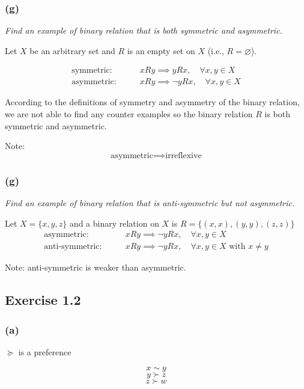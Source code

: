 \documentclass[a4paper]{article}
\begin{document}
\subsubsection*{(g)}

\textit{Find an example of binary relation that is both symmetric and asymmetric.}

Let $X$ be an arbitrary set and $R$ is an empty set on $X$ (i.e., $R=\varnothing$).

\begin{align*}
    \text{symmetric:} \qquad & xRy\implies yRx, \quad \forall x, y\in X \\
    \text{asymmetric:} \qquad & xRy\implies\neg yRx, \quad \forall x, y\in X
\end{align*}

According to the definitions of symmetry and asymmetry of the binary relation, we are not able to find any counter examples so the binary relation $R$ is both symmetric and asymmetric.

Note:
\[\text{asymmetric} \implies \text{irreflexive} \]

\subsubsection*{(g)}

\textit{Find an example of binary relation that is anti-symmetric but not asymmetric.}

Let $X=\{x, y, z\}$ and a binary relation on $X$ is $R=\{(x,x), (y,y), (z,z) \}$
\begin{align*}
    \text{asymmetric:}\qquad & xRy \implies \neg yRx,\quad \forall x, y\in X \\
    \text{anti-symmetric:}\qquad & xRy \implies \neg yRx,\quad \forall x, y\in X \text{ with } x\neq y
\end{align*}

Note: anti-symmetric is weaker than asymmetric.

\subsection*{Exercise 1.2}

\subsubsection*{(a)}

$\succeq$ is a preference

\[x\sim y \]
\[y\succ z \]
\[z\succ w \]
\end{document}
